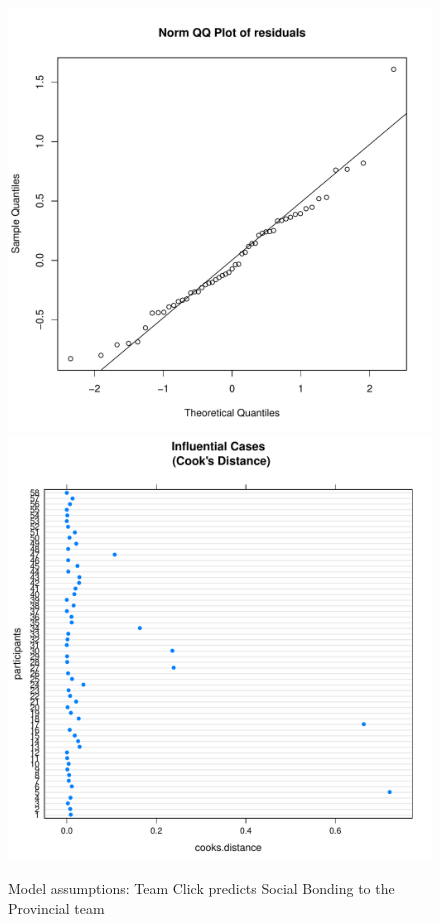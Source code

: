 \begin{CJK}{UTF8}{gbsn}
\begin{figure}[htbp]
    \includegraphics[scale =.4]{images/TEM2TeamQQNorm.pdf}
    \includegraphics[scale =.4]{images/TEM2TeamCooksD.pdf}
    \caption{Model assumptions: Team Click predicts Social Bonding to the Provincial team}
    \label{fig:M2TeamAssumptions}
\end{figure}



\end{CJK}
